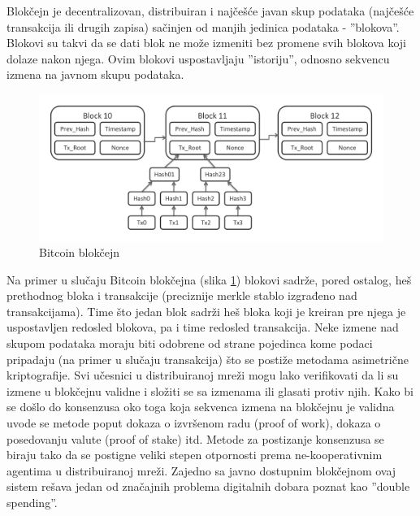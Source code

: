 \documentclass[a4paper]{article}
\begin{document}
{Blokčejn je decentralizovan, distribuiran i najčešće javan skup podataka (najčešće transakcija ili drugih zapisa) \cite{wood2014ethereum} sačinjen od manjih jedinica podataka - ''blokova''.
Blokovi su takvi da se dati blok ne može izmeniti bez promene svih blokova koji dolaze nakon njega. Ovim blokovi uspostavljaju ''istoriju'', odnosno sekvencu izmena na javnom skupu podataka.
\begin{figure}[H]
    \centering
        \includegraphics[scale=0.3]{bitcoin_blockchain_diagram.pdf}
    \caption{Bitcoin blokčejn}
    \label{fig:btc_blockchain}
\end{figure}
Na primer u slučaju Bitcoin blokčejna (slika \ref{fig:btc_blockchain}) blokovi sadrže, pored ostalog, heš prethodnog bloka i transakcije (preciznije merkle stablo izgrađeno nad transakcijama).
Time što jedan blok sadrži heš bloka koji je kreiran pre njega je uspostavljen redosled blokova, pa i time redosled transakcija.
Neke izmene nad skupom podataka moraju biti odobrene od strane pojedinca kome podaci pripadaju (na primer u slučaju transakcija) što se postiže metodama asimetrične kriptografije.
Svi učesnici u distribuiranoj mreži mogu lako verifikovati da li su izmene u blokčejnu validne i složiti se sa izmenama ili glasati protiv njih.
Kako bi se došlo do konsenzusa oko toga koja sekvenca izmena na blokčejnu je validna uvode se metode poput dokaza o izvršenom radu (proof of work), dokaza o posedovanju valute (proof of stake) itd.
Metode za postizanje konsenzusa se biraju tako da se postigne veliki stepen otpornosti prema ne-kooperativnim agentima u distribuiranoj mreži.
Zajedno sa javno dostupnim blokčejnom ovaj sistem rešava jedan od značajnih problema digitalnih dobara poznat kao ''double spending''. \cite{nakamoto2008bitcoin}

}
\end{document}
